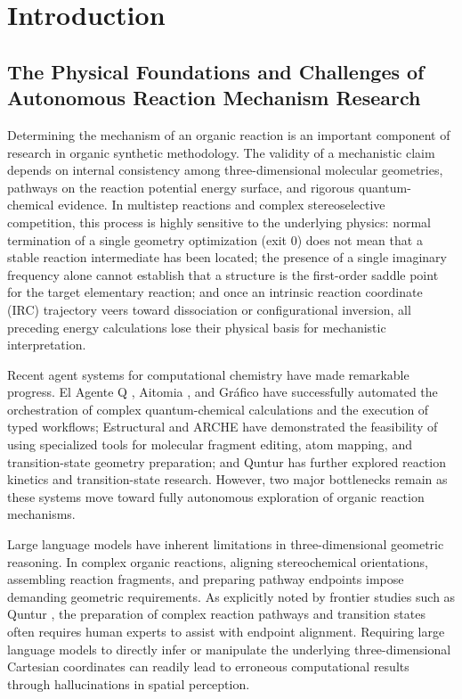 \section{Introduction}

\subsection{The Physical Foundations and Challenges of Autonomous Reaction Mechanism Research}

Determining the mechanism of an organic reaction is an important component of research in organic synthetic methodology. The validity of a mechanistic claim depends on internal consistency among three-dimensional molecular geometries, pathways on the reaction potential energy surface, and rigorous quantum-chemical evidence. In multistep reactions and complex stereoselective competition, this process is highly sensitive to the underlying physics: normal termination of a single geometry optimization (exit 0) does not mean that a stable reaction intermediate has been located; the presence of a single imaginary frequency alone cannot establish that a structure is the first-order saddle point for the target elementary reaction; and once an intrinsic reaction coordinate (IRC) trajectory veers toward dissociation or configurational inversion, all preceding energy calculations lose their physical basis for mechanistic interpretation.

Recent agent systems for computational chemistry have made remarkable progress. El Agente Q \citep{ref01}, Aitomia \citep{ref02}, and Gráfico \citep{ref06} have successfully automated the orchestration of complex quantum-chemical calculations and the execution of typed workflows; Estructural \citep{ref04} and ARCHE \citep{ref05} have demonstrated the feasibility of using specialized tools for molecular fragment editing, atom mapping, and transition-state geometry preparation; and Quntur \citep{ref03} has further explored reaction kinetics and transition-state research. However, two major bottlenecks remain as these systems move toward fully autonomous exploration of organic reaction mechanisms.

Large language models have inherent limitations in three-dimensional geometric reasoning. In complex organic reactions, aligning stereochemical orientations, assembling reaction fragments, and preparing pathway endpoints impose demanding geometric requirements. As explicitly noted by frontier studies such as Quntur \citep{ref03}, the preparation of complex reaction pathways and transition states often requires human experts to assist with endpoint alignment. Requiring large language models to directly infer or manipulate the underlying three-dimensional Cartesian coordinates can readily lead to erroneous computational results through hallucinations in spatial perception.

